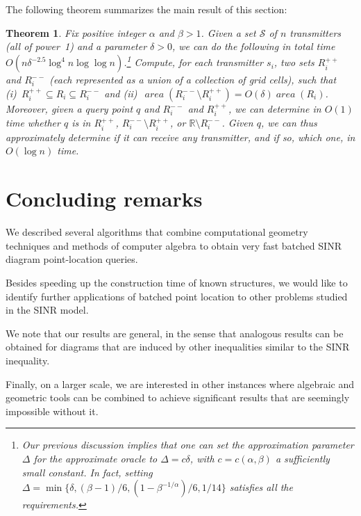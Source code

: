 \documentclass[11pt]{article}
\newtheorem{theorem}{Theorem}[section]
\theoremstyle{remark}
\DeclareMathOperator{\area}{\mathit{area}}
\def\S{\mathcal{S}}
\def\RR{\mathbb{R}}
\begin{document}
The following theorem summarizes the main result of this section:
\begin{theorem}
Fix positive integer $\alpha$ and $\beta>1$.
Given a set $\S$ of $n$ transmitters (all of power~1) and a parameter $\delta > 0$,
we can do the following in total time $O(n \delta^{-2.5} \log^4 n \log \log n)$.\footnote{Our previous discussion implies that one can set the approximation parameter $\Delta$ for the approximate oracle to $\Delta = c\delta$, with 
$c=c(\alpha,\beta)$ a sufficiently small constant.  In fact, 
setting $\Delta = \min\{\delta, (\beta-1)/6, (1-\beta^{-1/\alpha})/6, 1/14\}$ satisfies all the requirements.}
Compute, for each transmitter $s_i$, two sets $R_i^{++}$ and $R_i^{--}$ (each represented as a union of a collection of grid cells), such that
(i)~$R_i^{++} \subseteq R_i \subseteq R_i^{--}$ and (ii)~$\area(R^{--}_i \setminus R^{++}_i) = O(\delta) \area(R_i)$.
Moreover, given a query point $q$ and $R_i^{--}$ and $R_i^{++}$, we can determine in $O(1)$ time whether $q$ is in $R_i^{++}$, $R_i^{--} \setminus R_i^{++}$, or $\RR \setminus R_i^{--}$.  Given $q$, we can thus approximately determine if it can receive any transmitter, and if so, which one, in $O(\log n)$ time. 
\end{theorem}













\section{Concluding remarks}
\label{sec:conl}

We described several algorithms that combine computational geometry techniques and methods of computer algebra to obtain very fast batched SINR diagram point-location queries.



Besides speeding up the construction time of known structures, we would like to identify further applications of batched point location to other problems studied in the SINR model.

We note that our results are general, in the sense that analogous results can be obtained for diagrams that are induced by other inequalities similar to the SINR inequality. 

Finally, on a larger scale, we are interested in other instances where algebraic and geometric tools can be combined to achieve significant results that are seemingly impossible without it.
\end{document}
